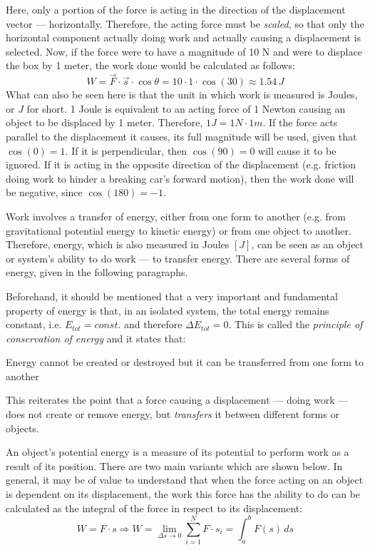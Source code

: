 Here, only a portion of the force is acting in the direction of the displacement vector --- horizontally. Therefore, the acting force must be \emph{scaled}, so that only the horizontal component actually doing work and actually causing a displacement is selected. Now, if the force were to have a magnitude of 10 N and were to displace the box by 1 meter, the work done would be calculated as follows: $$W = \vec{F} \cdot \vec{s} \cdot \cos \theta = 10 \cdot 1 \cdot \cos(30) \approx 1.54 \, J$$ What can also be seen here is that the unit in which work is measured is Joules, or $J$ for short. 1 Joule is equivalent to an acting force of 1 Newton causing an object to be displaced by 1 meter. Therefore, $1 J = 1 N \cdot 1 m$. If the force acts parallel to the displacement it causes, its full magnitude will be used, given that $\cos(0) = 1$. If it is perpendicular, then $\cos(90) = 0$ will cause it to be ignored. If it is acting in the opposite direction of the displacement (e.g. friction doing work to hinder a breaking car's forward motion), then the work done will be negative, since $\cos(180) = -1$. 

\pagebreak


Work involves a transfer of energy, either from one form to another (e.g. from gravitational potential energy to kinetic energy) or from one object to another. Therefore, energy, which is also measured in Joules $[J]$, can be seen as an object or system's ability to do work --- to transfer energy. There are several forms of energy, given in the following paragraphs.

Beforehand, it should be mentioned that a very important and fundamental property of energy is that, in an isolated system, the total energy remains constant, i.e. $E_{tot} = const.$ and therefore $\Delta E_{tot} = 0$. This is called the \emph{principle of conservation of energy} and it states that:

\begin{displayquote}
	Energy cannot be created or destroyed but it can be transferred from one form to another
\end{displayquote}

This reiterates the point that a force causing a displacement --- doing work --- does not create or remove energy, but \emph{transfers} it between different forms or objects.


An object's potential energy is a measure of its potential to perform work as a result of its position. There are two main variants which are shown below. In general, it may be of value to understand that when the force acting on an object is dependent on its displacement, the work this force has the ability to do can be calculated as the integral of the force in respect to its displacement: $$W = F \cdot s \Rightarrow W = \lim_{\Delta s \rightarrow 0} \sum_{i=1}^{N} F \cdot s_i = \int_{a}^{b} F(s) \, ds$$

